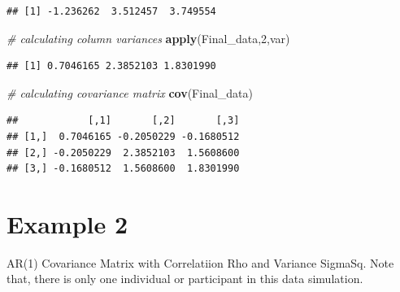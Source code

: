 \documentclass[]{book}
\newenvironment{Shaded}{\begin{snugshade}}{\end{snugshade}}
\newcommand{\CommentTok}[1]{\textcolor[rgb]{0.56,0.35,0.01}{\textit{#1}}}
\newcommand{\DecValTok}[1]{\textcolor[rgb]{0.00,0.00,0.81}{#1}}
\newcommand{\KeywordTok}[1]{\textcolor[rgb]{0.13,0.29,0.53}{\textbf{#1}}}
\newcommand{\NormalTok}[1]{#1}
\begin{document}
\begin{verbatim}
## [1] -1.236262  3.512457  3.749554
\end{verbatim}

\begin{Shaded}
\begin{Highlighting}[]
\CommentTok{# calculating column variances}
\KeywordTok{apply}\NormalTok{(Final_data,}\DecValTok{2}\NormalTok{,var)}
\end{Highlighting}
\end{Shaded}

\begin{verbatim}
## [1] 0.7046165 2.3852103 1.8301990
\end{verbatim}

\begin{Shaded}
\begin{Highlighting}[]
\CommentTok{# calculating covariance matrix}
\KeywordTok{cov}\NormalTok{(Final_data)}
\end{Highlighting}
\end{Shaded}

\begin{verbatim}
##            [,1]       [,2]       [,3]
## [1,]  0.7046165 -0.2050229 -0.1680512
## [2,] -0.2050229  2.3852103  1.5608600
## [3,] -0.1680512  1.5608600  1.8301990
\end{verbatim}

\hypertarget{example-2}{%
\section{Example 2}\label{example-2}}

AR(1) Covariance Matrix with Correlatiion Rho and Variance SigmaSq. Note that, there is only one individual or participant in this data simulation.
\end{document}
